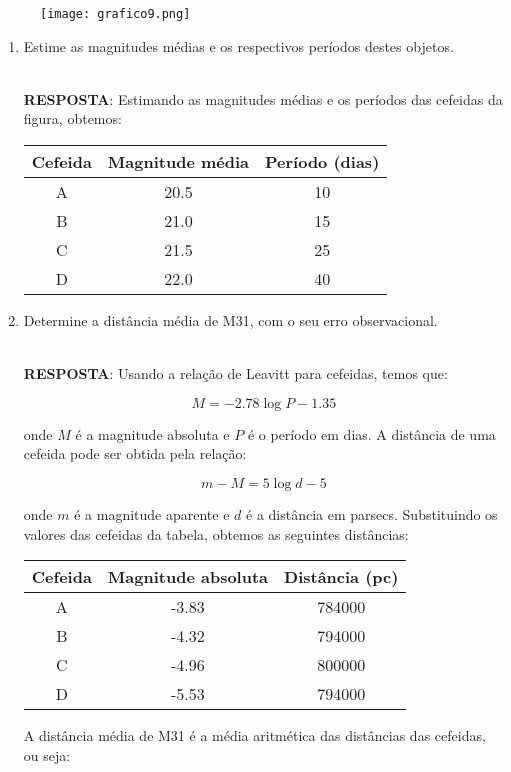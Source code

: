 \documentclass[a4paper,12pt]{article}
\begin{document}
\begin{enumerate}
\begin{figure}[H]
    \centering
    \texttt{[image: grafico9.png]}
\end{figure}

\begin{enumerate}
\item Estime as magnitudes médias e os respectivos períodos destes objetos.

\noindent\hrulefill\\\textbf{RESPOSTA}: Estimando as magnitudes médias e os períodos das cefeidas da figura, obtemos:

\begin{tabular}{|c|c|c|}
\hline
Cefeida & Magnitude média & Período (dias) \\
\hline
A & 20.5 & 10 \\
\hline
B & 21.0 & 15 \\
\hline
C & 21.5 & 25 \\
\hline
D & 22.0 & 40 \\
\hline
\end{tabular}

\noindent\hrulefill

\item Determine a distância média de M31, com o seu erro observacional.

\noindent\hrulefill\\\textbf{RESPOSTA}: Usando a relação de Leavitt para cefeidas, temos que:

$$M = -2.78 \log P - 1.35$$

onde $M$ é a magnitude absoluta e $P$ é o período em dias. A distância de uma cefeida pode ser obtida pela relação:

$$m - M = 5 \log d - 5$$

onde $m$ é a magnitude aparente e $d$ é a distância em parsecs. Substituindo os valores das cefeidas da tabela, obtemos as seguintes distâncias:

\begin{tabular}{|c|c|c|}
\hline
Cefeida & Magnitude absoluta & Distância (pc) \\
\hline
A & -3.83 & 784000 \\
\hline
B & -4.32 & 794000 \\
\hline
C & -4.96 & 800000 \\
\hline
D & -5.53 & 794000 \\
\hline
\end{tabular}

A distância média de M31 é a média aritmética das distâncias das cefeidas, ou seja:


\end{enumerate}
\end{enumerate}
\end{document}
